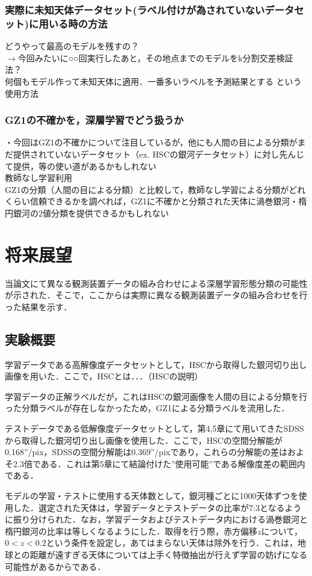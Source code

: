 \documentclass[a4j, 11pt]{jreport}
\begin{document}
\subsubsection{実際に未知天体データセット(ラベル付けが為されていないデータセット)に用いる時の方法}
どうやって最高のモデルを残すの？\\
$\to$今回みたいに○○回実行したあと，その地点までのモデルをk分割交差検証法？\\
何個もモデル作って未知天体に適用．一番多いラベルを予測結果とする という使用方法\\

\subsubsection{GZ1の不確かを，深層学習でどう扱うか}
・今回はGZ1の不確かについて注目しているが，他にも人間の目による分類がまだ提供されていないデータセット（ex. HSCの銀河データセット）に対し先んじて提供，等の使い道があるかもしれない\\
教師なし学習利用\\
GZ1の分類（人間の目による分類）と比較して，教師なし学習による分類がどれくらい信頼できるかを調べれば，GZ1に不確かと分類された天体に渦巻銀河・楕円銀河の2値分類を提供できるかもしれない


\section{将来展望}
当論文にて異なる観測装置データの組み合わせによる深層学習形態分類の可能性が示された．そこで，ここからは実際に異なる観測装置データの組み合わせを行った結果を示す．
\subsection{実験概要}
学習データである高解像度データセットとして，HSCから取得した銀河切り出し画像を用いた．ここで，HSCとは．．．（HSCの説明）

学習データの正解ラベルだが，これはHSCの銀河画像を人間の目による分類を行った分類ラベルが存在しなかったため，GZ1による分類ラベルを流用した．

テストデータである低解像度データセットとして，第4,5章にて用いてきたSDSSから取得した銀河切り出し画像を使用した．ここで，HSCの空間分解能が0.168''/pix，SDSSの空間分解能は0.369''/pixであり，これらの分解能の差はおよそ2.3倍である．これは第5章にて結論付けた''使用可能''である解像度差の範囲内である．

モデルの学習・テストに使用する天体数として，銀河種ごとに1000天体ずつを使用した．選定された天体は，学習データとテストデータの比率が7:3となるように振り分けられた．なお，学習データおよびテストデータ内における渦巻銀河と楕円銀河の比率は等しくなるようにした．取得を行う際，赤方偏移$z$について，$0 < z < 0.2$という条件を設定し，あてはまらない天体は除外を行う．これは，地球との距離が遠すぎる天体については上手く特徴抽出が行えず学習の妨げになる可能性があるからである．
\end{document}
